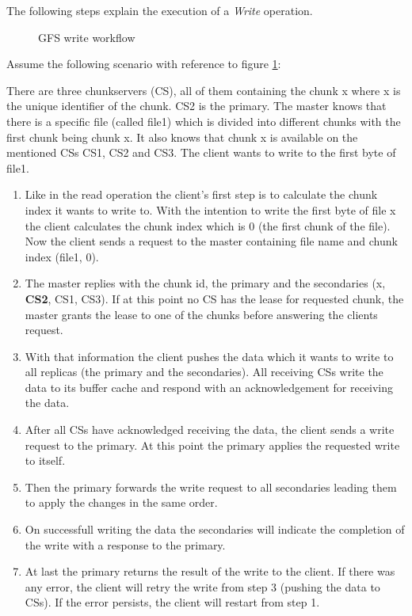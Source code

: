 \documentclass{sig-alternate}
\begin{document}
The following steps explain the execution of a \textit{Write} operation.

\begin{figure}[!hbt]
\centering
{}
\caption{GFS write workflow}
\label{fig:gfs_write}
\end{figure}

Assume the following scenario with reference to figure \ref{fig:gfs_write}:

There are three chunkservers (CS), all of them containing the chunk x where x is the unique identifier of the chunk. CS2 is the primary. The master knows that there is a specific file (called file1) which is divided into different chunks with the first chunk being chunk x. It also knows that chunk x is available on the mentioned CSs CS1, CS2 and CS3. The client wants to write to the first byte of file1.

\begin{enumerate}
\item 
Like in the read operation the client's first step is to calculate the chunk index it wants to write to. With the intention to write the first byte of file x the client calculates the chunk index which is 0 (the first chunk of the file). Now the client sends a request to the master containing file name and chunk index (file1, 0).

\item
The master replies with the chunk id, the primary and the secondaries (x, \textbf{CS2}, CS1, CS3). If at this point no CS has the lease for requested chunk, the master grants the lease to one of the chunks before answering the clients request.

\item
With that information the client pushes the data which it wants to write to all replicas (the primary and the secondaries). All receiving CSs write the data to its buffer cache and respond with an acknowledgement for receiving the data.

\item
After all CSs have acknowledged receiving the data, the client sends a write request to the primary. At this point the primary applies the requested write to itself.

\item
Then the primary forwards the write request to all secondaries leading them to apply the changes in the same order.

\item
On successfull writing the data the secondaries will indicate the completion of the write with a response to the primary.

\item
At last the primary returns the result of the write to the client. If there was any error, the client will retry the write from step 3 (pushing the data to CSs). If the error persists, the client will restart from step 1.

\end{enumerate}
\end{document}
